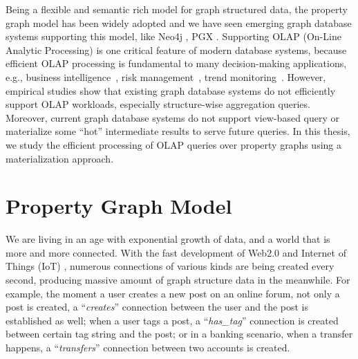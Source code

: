 

Being a flexible and semantic rich model for graph structured data, the property graph model has been widely adopted and we have seen emerging graph database systems supporting this model, like Neo4j \cite{DBLP:conf/oopsla/Webber12}, PGX \cite{DBLP:conf/sc/HongDMLVC15}. Supporting OLAP (On-Line Analytic Processing) is one critical feature of modern database systems, because efficient OLAP processing is fundamental to many decision-making applications, e.g., business intelligence~\cite{Petermann:2014:GDI:2733004.2733034}, risk management~\cite{DBLP:conf/iccsa/ZazaBGFSC17}, trend monitoring~\cite{DBLP:journals/tii/FangXZAPYL14}. However, empirical studies show that existing graph database systems do not efficiently support OLAP workloads, especially structure-wise aggregation queries. Moreover, current graph database systems do not support view-based query or materialize some ``hot'' intermediate results to serve future queries. In this thesis, we study the efficient processing of OLAP queries over property graphs  using a materialization approach.


\section{Property Graph Model}
\label{s:1}

We are living in an age with exponential growth of data, and a world that is more and more connected.  With the fast development of Web2.0 and Internet of Things (IoT) \cite{DBLP:journals/ijcomsys/XiaYWV12}, numerous connections of various kinds are being created every second, producing massive amount of graph structure data in the meanwhile. For example, the moment a user creates a new post on an online forum, not only a post is created,  a ``\emph{creates}'' connection between the user and the post is established as well; when a user tags a post, a ``\emph{has\_tag}'' connection is created between certain tag string and the post; or in a banking scenario, when a transfer happens, a ``\emph{transfers}'' connection between two accounts is created.

